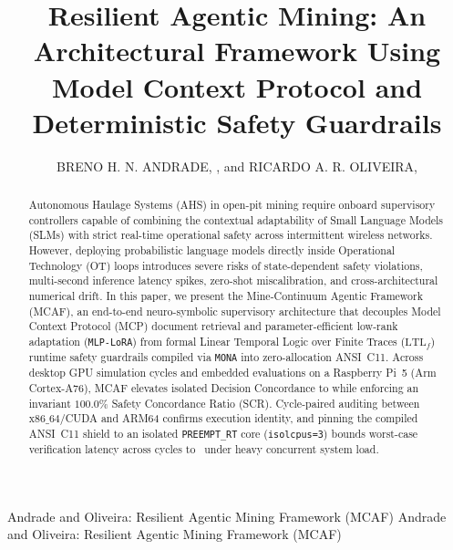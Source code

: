 \documentclass{ieeeaccess}
\begin{document}

\title{Resilient Agentic Mining: An Architectural Framework Using Model Context Protocol and Deterministic Safety Guardrails}

\author{\uppercase{Breno H. N. Andrade}, ,
and \uppercase{Ricardo A. R. Oliveira}, }

\address[1]{Departamento de Computa\c{c}\~{a}o (DECOM), Universidade Federal de Ouro Preto (UFOP), Ouro Preto, MG 35400-000, Brazil}
\address[2]{Instituto Tecnol\'{o}gico Vale (ITV), Belo Horizonte, MG, Brazil}


\markboth
{Andrade and Oliveira: Resilient Agentic Mining Framework (MCAF)}
{Andrade and Oliveira: Resilient Agentic Mining Framework (MCAF)}


\begin{abstract}
Autonomous Haulage Systems (AHS) in open-pit mining require onboard supervisory controllers capable of combining the contextual adaptability of Small Language Models (SLMs) with strict real-time operational safety across intermittent wireless networks. However, deploying probabilistic language models directly inside Operational Technology (OT) loops introduces severe risks of state-dependent safety violations, multi-second inference latency spikes, zero-shot miscalibration, and cross-architectural numerical drift. In this paper, we present the Mine-Continuum Agentic Framework (MCAF), an end-to-end neuro-symbolic supervisory architecture that decouples Model Context Protocol (MCP) document retrieval and parameter-efficient low-rank adaptation (\texttt{MLP-LoRA}) from formal Linear Temporal Logic over Finite Traces ($\mathrm{LTL}_f$) runtime safety guardrails compiled via \texttt{MONA} into zero-allocation ANSI~C11. Across {\TotalDesktopCycles} desktop GPU simulation cycles and {\TotalPiCycles} embedded evaluations on a Raspberry Pi~5 (Arm Cortex-A76), MCAF elevates isolated Decision Concordance to {\LoRAHybridRAGDC} while enforcing an invariant $100.0\%$ Safety Concordance Ratio (\textsc{SCR}). Cycle-paired auditing between $\text{x86\_64}$/CUDA and ARM64 confirms {\CrossArchLoRAIdentity} execution identity, and pinning the compiled ANSI~C11 shield to an isolated \texttt{PREEMPT\_RT} core (\texttt{isolcpus=3}) bounds worst-case verification latency across {\TotalCShieldCycles} cycles to \CShieldRTStressedMaxUs\ under heavy concurrent system load.
\end{abstract}
\end{document}

